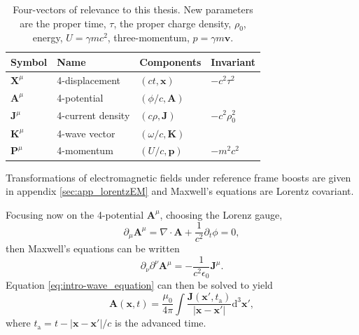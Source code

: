 \begin{table}
	\begin{center}
		\begin{tabular}{llll}
			\hline \hline
			Symbol & Name & Components & Invariant \\
			\hline
			$\mathbf{X}^\mu$& 4-displacement & $(ct, \mathbf{x})$ & $-c^2\tau^2$  \\
			$\mathbf{A}^\mu$&4-potential  & $(\phi/c, \mathbf{A})$  &  \\
			$\mathbf{J}^\mu$& 4-current density & $(c\rho,\mathbf{J})$ & $-c^2\rho_0^2$ \\
			$\mathbf{K}^\mu$& 4-wave vector &$(\omega/c, \mathbf{K})$  &  \\
			$\mathbf{P}^\mu$& 4-momentum &  $(U/c, \mathbf{p})$& $-m^2c^2$ \\
			\hline \hline
		\end{tabular}
		\caption{\label{tab:intro-four-vectors} Four-vectors of relevance to this thesis. New parameters are the proper time, $\tau$, the proper charge density, $\rho_0$, energy, $U = \gamma m c^2$, three-momentum, $p = \gamma m\mathbf{v}$.}
	\end{center}
\end{table}
Transformations of electromagnetic fields under reference frame boosts are given in appendix \ref{sec:app_lorentzEM} and Maxwell's equations are Lorentz covariant.

Focusing now on the 4-potential $\mathbf{A}^\mu$, choosing the Lorenz gauge,
\begin{equation}
	\partial_\mu \mathbf{A}^\mu = \nabla \cdot \mathbf{A} + \frac{1}{c^2}\partial_t \phi = 0,
\end{equation}
then Maxwell's equations can be written
\begin{equation}\label{eq:intro-wave_equation}
	\partial_\nu \partial^\nu \mathbf{A}^\mu = -\frac{1}{c^2\epsilon_0}\mathbf{J}^\mu.
\end{equation}
Equation \ref{eq:intro-wave_equation} can then be solved to yield 
\begin{equation}
	\mathbf{A}(\mathbf{x},t) = \frac{\mu_0}{4\pi} \int \frac{\mathbf{J}(\mathbf{x'},t_\mathrm{a})}{|\mathbf{x}-\mathbf{x}'|} \mathrm{d}^3\mathbf{x}',
\end{equation}
where $t_\mathrm{a} = t- |\mathbf{x}-\mathbf{x}'|/c$ is the advanced time.

